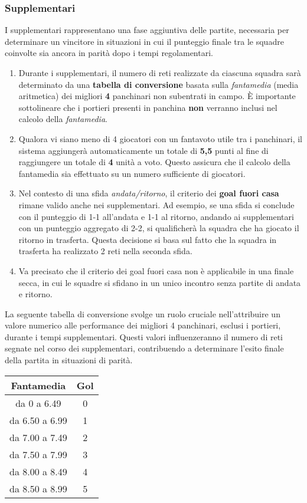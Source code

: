 \documentclass[12pt]{article}
\begin{document}
\subsubsection{Supplementari}

I supplementari rappresentano una fase aggiuntiva delle partite, necessaria per determinare un vincitore in situazioni in cui il punteggio finale tra le squadre coinvolte sia ancora in parità dopo i tempi regolamentari.

\begin{enumerate}
    \item Durante i supplementari, il numero di reti realizzate da ciascuna squadra sarà determinato da una \textbf{tabella di conversione} basata sulla \textit{fantamedia} (media aritmetica) dei migliori \textbf{4} panchinari non subentrati in campo. È importante sottolineare che i portieri presenti in panchina \textbf{non} verranno inclusi nel calcolo della \textit{fantamedia}.
    \item Qualora vi siano meno di 4 giocatori con un fantavoto utile tra i panchinari, il sistema aggiungerà automaticamente un totale di \textbf{5,5} punti al fine di raggiungere un totale di \textbf{4} unità a voto. Questo assicura che il calcolo della fantamedia sia effettuato su un numero sufficiente di giocatori.
    \item Nel contesto di una sfida \textit{andata/ritorno}, il criterio dei \textbf{goal fuori casa} rimane valido anche nei supplementari. Ad esempio, se una sfida si conclude con il punteggio di 1-1 all'andata e 1-1 al ritorno, andando ai supplementari con un punteggio aggregato di 2-2, si qualificherà la squadra che ha giocato il ritorno in trasferta. Questa decisione si basa sul fatto che la squadra in trasferta ha realizzato 2 reti nella seconda sfida.
    \item Va precisato che il criterio dei goal fuori casa non è applicabile in una finale secca, in cui le squadre si sfidano in un unico incontro senza partite di andata e ritorno.
\end{enumerate}

La seguente tabella di conversione svolge un ruolo cruciale nell'attribuire un valore numerico alle performance dei migliori 4 panchinari, esclusi i portieri, durante i tempi supplementari. Questi valori influenzeranno il numero di reti segnate nel corso dei supplementari, contribuendo a determinare l'esito finale della partita in situazioni di parità.
\newline
\\
\begin{tabular}{|c|c|}
    \hline
    \textbf{Fantamedia} & \textbf{Gol} \\
    \hline
    da 0 a 6.49 & 0 \\
    \hline
    da 6.50 a 6.99 & 1 \\
    \hline
    da 7.00 a 7.49 & 2 \\
    \hline
    da 7.50 a 7.99 & 3 \\
    \hline
    da 8.00 a 8.49 & 4 \\
    \hline
    da 8.50 a 8.99 & 5 \\
    \hline
  \end{tabular}
\newline 
\end{document}
